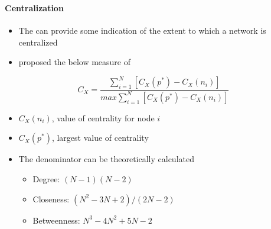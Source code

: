 \documentclass[8pt]{beamer}
\begin{document}
\begin{frame}
\frametitle{\insertsection}
\framesubtitle{Centralization}

\begin{itemize}
\item The {\color{blue}{distribution of centrality}} can provide some indication of the extent to which a network is centralized
\item \cite{Freeman1978} proposed the below measure of {\color{blue}{centralization}}
\end{itemize}

\begin{equation*}
C_X = \frac{\sum_{i=1}^{N}[C_X(p^*)-C_X(n_i)]}{max\sum_{i=1}^{N}[C_X(p^*)-C_X(n_i)]}
\end{equation*}

\begin{itemize}
\item $C_X(n_i)$, value of centrality for node $i$
\item $C_X(p^*)$, largest value of centrality 
\item The denominator can be theoretically calculated
	\begin{itemize}
	\item Degree: $(N-1)(N-2)$
	\item Closeness: $(N^2-3N+2)/(2N-2)$
	\item Betweenness: $N^3-4N^2+5N-2$
	\end{itemize}
\end{itemize}

\end{frame}

\end{document}
